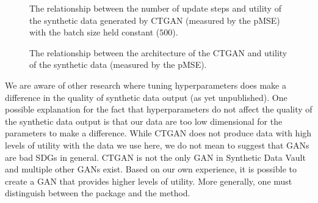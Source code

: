 \documentclass[runningheads]{llncs}
\begin{document}
\begin{figure}[t]
    \centering        
    
    \caption{The relationship between the number of update steps and utility of the synthetic data generated by CTGAN (measured by the pMSE) with the batch size held constant ($500$).}\label{fig:ctgan_fidelity_optimize_epochs}
    \vspace{-2em}
\end{figure}
    
\begin{figure}[t]
    \centering        
   
     \caption{The relationship between the architecture of the CTGAN and utility of the synthetic data (measured by the pMSE).}
     \label{fig:ctgan_fidelity_optimize_dimensions}
     \vspace{-2em}
\end{figure}

We are aware of other research where tuning hyperparameters does make a difference in the quality of synthetic data output (as yet unpublished).  One possible explanation for the fact that hyperparameters do not affect the quality of the synthetic data output is that our data are too low dimensional for the parameters to make a difference.  While CTGAN does not produce data with high levels of utility with the data we use here, we do not mean to suggest that GANs are bad SDGs in general.  CTGAN is not the only GAN in Synthetic Data Vault and multiple other GANs exist. Based on our own experience, it is possible to create a GAN that provides higher levels of utility.  More generally, one must distinguish between the package and the method.  
\end{document}
